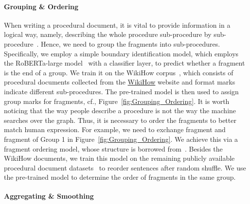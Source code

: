 \paragraph{Grouping \& Ordering}

When writing a procedural document, it is vital to provide information in a logical way, namely, describing the whole procedure sub-procedure by sub-procedure~\cite{futrelle1999summarization, futrelle2004handling}. Hence, we need to group the fragments into sub-procedures. Specifically, we employ a simple boundary identification model, which employs the RoBERTa-large model~\cite{liu2019roberta} with a classifier layer, to predict whether a fragment is the end of a group. We train it on the WikiHow corpus~\citet{bolotova2023wikihowqa}, which consists of procedural documents collected from the \href{https://www.wikihow.com/}{WikiHow} website and format marks indicate different sub-procedures. The pre-trained model is then used to assign group marks for fragments, cf., Figure~\ref{fig:Grouping_Ordering}.
It is worth noticing that the way people describe a procedure is not the way the machine searches over the graph. Thus, it is necessary to order the fragments to better match human expression. For example, we need to exchange fragment  and fragment of Group 1 in Figure~\ref{fig:Grouping_Ordering}. We achieve this via a fragment ordering model, whose structure is borrowed from~\citet{bin2023non}. Besides the WikiHow documents, we train this model on the remaining publicly
available procedural document datasets~\cite{castelli2020techqa, zhang-etal-2020-reasoning, lyu2021goal,sakaguchi2021proscript, nandy2021question} to reorder sentences after random shuffle. We use the pre-trained model to determine the order of fragments in the same group.

\paragraph{Aggregating \& Smoothing}

